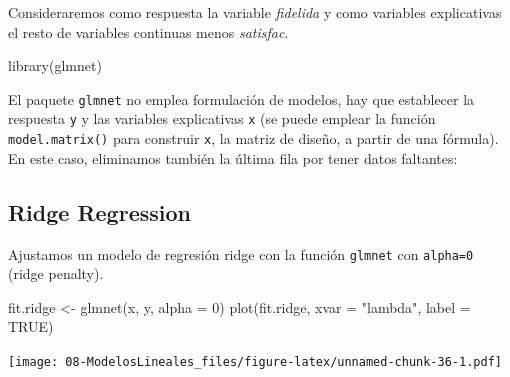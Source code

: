 \documentclass[
]{book}
\newenvironment{Shaded}{\begin{snugshade}}{\end{snugshade}}
\newcommand{\AttributeTok}[1]{\textcolor[rgb]{0.77,0.63,0.00}{#1}}
\newcommand{\ConstantTok}[1]{\textcolor[rgb]{0.00,0.00,0.00}{#1}}
\newcommand{\DecValTok}[1]{\textcolor[rgb]{0.00,0.00,0.81}{#1}}
\newcommand{\FunctionTok}[1]{\textcolor[rgb]{0.00,0.00,0.00}{#1}}
\newcommand{\NormalTok}[1]{#1}
\newcommand{\OtherTok}[1]{\textcolor[rgb]{0.56,0.35,0.01}{#1}}
\newcommand{\SpecialCharTok}[1]{\textcolor[rgb]{0.00,0.00,0.00}{#1}}
\newcommand{\StringTok}[1]{\textcolor[rgb]{0.31,0.60,0.02}{#1}}
\theoremstyle{break}
\begin{document}
Consideraremos como respuesta la variable \emph{fidelida} y como variables explicativas
el resto de variables continuas menos \emph{satisfac}.

\begin{Shaded}
\begin{Highlighting}[]
\FunctionTok{library}\NormalTok{(glmnet)}
\end{Highlighting}
\end{Shaded}

El paquete \texttt{glmnet} no emplea formulación de modelos, hay que establecer la respuesta
\texttt{y} y las variables explicativas \texttt{x} (se puede emplear la función \texttt{model.matrix()} para construir \texttt{x},
la matriz de diseño, a partir de una fórmula).
En este caso, eliminamos también la última fila por tener datos faltantes:

\begin{Shaded}
\end{Shaded}

\hypertarget{ridge-regression}{%
\subsection{Ridge Regression}\label{ridge-regression}}

Ajustamos un modelo de regresión ridge con la función \texttt{glmnet} con \texttt{alpha=0} (ridge penalty).

\begin{Shaded}
\begin{Highlighting}[]
\NormalTok{fit.ridge }\OtherTok{\textless{}{-}} \FunctionTok{glmnet}\NormalTok{(x, y, }\AttributeTok{alpha =} \DecValTok{0}\NormalTok{)}
\FunctionTok{plot}\NormalTok{(fit.ridge, }\AttributeTok{xvar =} \StringTok{"lambda"}\NormalTok{, }\AttributeTok{label =} \ConstantTok{TRUE}\NormalTok{)}
\end{Highlighting}
\end{Shaded}

\texttt{[image: 08-ModelosLineales\_files/figure-latex/unnamed-chunk-36-1.pdf]}
\end{document}
